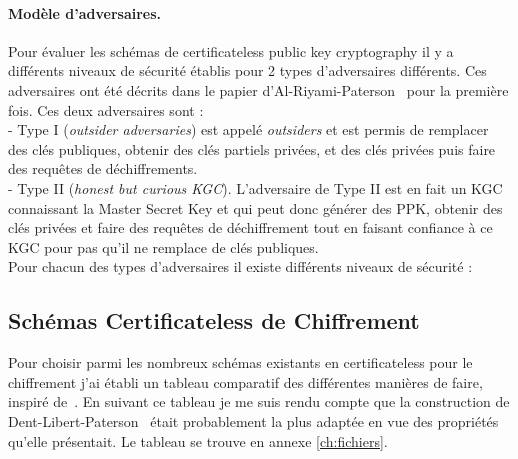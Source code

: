 \paragraph*{Modèle d'adversaires.}
Pour évaluer les schémas de certificateless public key cryptography il y a différents niveaux de sécurité établis pour 2 types d'adversaires différents. Ces adversaires ont été décrits dans le papier d'Al-Riyami-Paterson~\cite{DBLP:conf/asiacrypt/Al-RiyamiP03} pour la première fois. Ces deux adversaires sont :\\
- Type I (\textit{outsider adversaries}) est appelé \textit{outsiders} et est permis de remplacer des clés publiques, obtenir des clés partiels privées, et des clés privées puis faire des requêtes de déchiffrements.\\
- Type II (\textit{honest but curious KGC}). L'adversaire de Type II est en fait un KGC connaissant la Master Secret Key et qui peut donc générer des PPK, obtenir des clés privées et faire des requêtes de déchiffrement tout en faisant confiance à ce KGC pour pas qu'il ne remplace de clés publiques.\\
Pour chacun des types d'adversaires il existe différents niveaux de sécurité :\\
\subsection{Schémas Certificateless de Chiffrement}
Pour choisir parmi les nombreux schémas existants en certificateless pour le chiffrement j'ai établi un tableau comparatif des différentes manières de faire, inspiré de~\cite{bookIntroCertificateless}. En suivant ce tableau je me suis rendu compte que la construction de Dent-Libert-Paterson~\cite{DBLP:conf/pkc/DentLP08} était probablement la plus adaptée en vue des propriétés qu'elle présentait. Le tableau se trouve en annexe \ref{ch:fichiers}.

